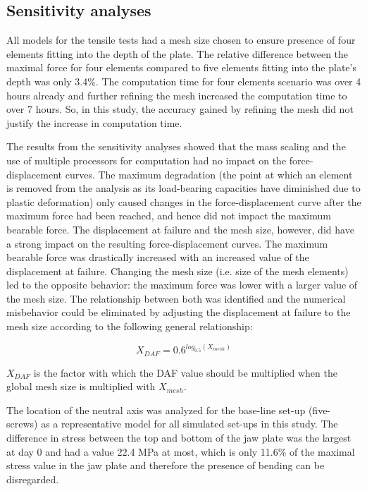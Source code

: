 
\subsection{Sensitivity analyses}

All models for the tensile tests had a mesh size chosen to ensure presence of four elements fitting into the depth of the plate. The relative difference between the maximal force for four elements compared to five elements fitting into the plate’s depth was only 3.4\%. The computation time for four elements scenario was over 4 hours already and further refining the mesh increased the computation time to over 7 hours. So, in this study, the accuracy gained by refining the mesh did not justify the increase in computation time.

The results from the sensitivity analyses showed that the mass scaling and the use of multiple processors for computation had no impact on the force-displacement curves. The maximum degradation (the point at which an element is removed from the analysis as its load-bearing capacities have diminished due to plastic deformation) only caused changes in the force-displacement curve after the maximum force had been reached, and hence did not impact the maximum bearable force. The displacement at failure and the mesh size, however, did have a strong impact on the resulting force-displacement curves. The maximum bearable force was drastically increased with an increased value of the displacement at failure. Changing the mesh size (i.e. size of the mesh elements) led to the opposite behavior: the maximum force was lower with a larger value of the mesh size. The relationship between both was identified and the numerical misbehavior could be eliminated by adjusting the displacement at failure to the mesh size according to the following general relationship:

\begin{equation}
X_{DAF}=0.6^{log_{0.5}(X_{mesh})}
\end{equation}

\noindent $X_{DAF}$ is the factor with which the \gls{DAF} value should be multiplied when the global mesh size is multiplied with $X_{mesh}$.

The location of the neutral axis was analyzed for the base-line set-up (five-screws) as a representative model for all simulated set-ups in this study. The difference in stress between the top and bottom of the jaw plate was the largest at day 0 and had a value 22.4 MPa at most, which is only 11.6\% of the maximal stress value in the jaw plate and therefore the presence of bending can be disregarded.

